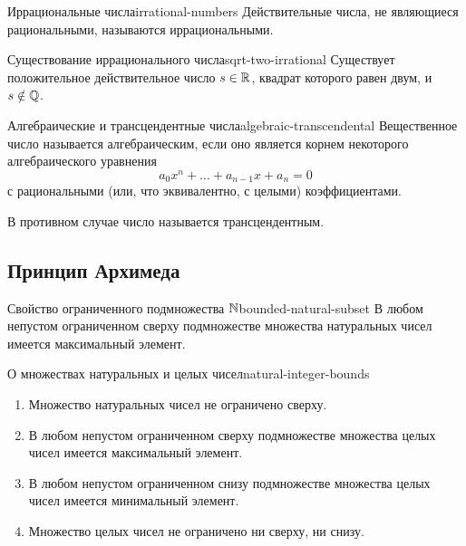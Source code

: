 \begin{definition}{Иррациональные числа}{irrational-numbers}
  Действительные числа, не являющиеся рациональными, называются
  иррациональными.
\end{definition}

\begin{proposition}{Существование иррационального числа}{sqrt-two-irrational}
  Существует положительное действительное число $s\in\mathbb{R}$, квадрат которого
  равен двум, и $s\notin\mathbb{Q}$.
\end{proposition}

\begin{definition}{Алгебраические и трансцендентные числа}{algebraic-transcendental}
  Вещественное число называется алгебраическим, если оно является корнем
  некоторого алгебраического уравнения
  \[
    a_0x^n+\ldots+a_{n-1}x+a_n=0
  \]
  с рациональными (или, что эквивалентно, с целыми) коэффициентами.

  В противном случае число называется трансцендентным.
\end{definition}

\subsection{Принцип Архимеда}

\begin{properties}{Свойство ограниченного подмножества $\mathbb{N}$}{bounded-natural-subset}
  В любом непустом ограниченном сверху подмножестве множества натуральных
  чисел имеется максимальный элемент.
\end{properties}

\begin{corollary}{О множествах натуральных и целых чисел}{natural-integer-bounds}
  \begin{enumerate}[label=\arabic*${}^{\circ}$.,start=2]
    \item Множество натуральных чисел не ограничено сверху.\par
    \item В любом непустом ограниченном сверху подмножестве множества целых
      чисел имеется максимальный элемент.\par
    \item В любом непустом ограниченном снизу подмножестве множества целых
      чисел имеется минимальный элемент.\par
    \item Множество целых чисел не ограничено ни сверху, ни снизу.
  \end{enumerate}
\end{corollary}

